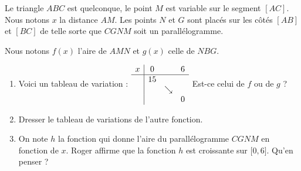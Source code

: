 
\begin{exercice}\label{exosmath-0657}


Le triangle \( ABC\) est quelconque, le point \( M\) est variable sur le segment \( [AC]\). Nous notons \( x\) la distance \( AM\). Les points \( N\) et \( G\) sont placés sur les côtés \( [AB]\) et \( [BC]\) de telle sorte que \( CGNM\) soit un parallélogramme.

Nous notons \( f(x)\) l'aire de \( AMN\) et \( g(x)\) celle de \( NBG\).

    \begin{center}
   
    \end{center}

\begin{enumerate}
    \item
        Voici un tableau de variation :
        \(
            \begin{array}[]{c|ccc}
                x&0&&6\\
                \hline
                &15&&\\
                &&\searrow&\\
                &&&0\\
            \end{array}
 \)
        Est-ce celui de \( f\) ou de \( g\) ?
    \item
        Dresser le tableau de variations de l'autre fonction.
    \item
        On note \( h\) la fonction qui donne l'aire du parallélogramme \( CGNM\) en fonction de \( x\). Roger affirme que la fonction \( h\) est croissante sur \( \mathopen[ 0 , 6 \mathclose]\). Qu'en penser ?
\end{enumerate}

\end{exercice}
